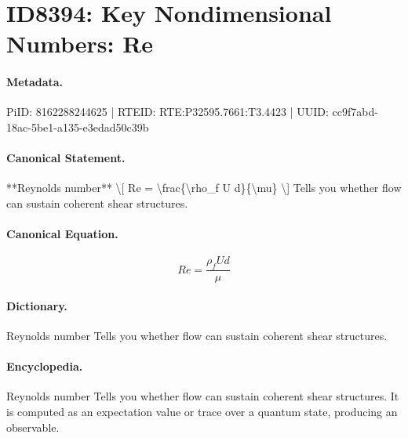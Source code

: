 \section*{ID8394: Key Nondimensional Numbers: Re}
\paragraph{Metadata.}
PiID: 8162288244625 | RTEID: RTE:P32595.7661:T3.4423 | UUID: cc9f7abd-18ac-5be1-a135-e3edad50c39b

\paragraph{Canonical Statement.}
**Reynolds number** \textbackslash{}[ Re = \textbackslash{}frac\{\textbackslash{}rho\_f U d\}\{\textbackslash{}mu\} \textbackslash{}] Tells you whether flow can sustain coherent shear structures.

\paragraph{Canonical Equation.}
\[
Re = \frac{\rho_f U d}{\mu}
\]

\paragraph{Dictionary.}
Reynolds number Tells you whether flow can sustain coherent shear structures.

\paragraph{Encyclopedia.}
Reynolds number Tells you whether flow can sustain coherent shear structures. It is computed as an expectation value or trace over a quantum state, producing an observable.
